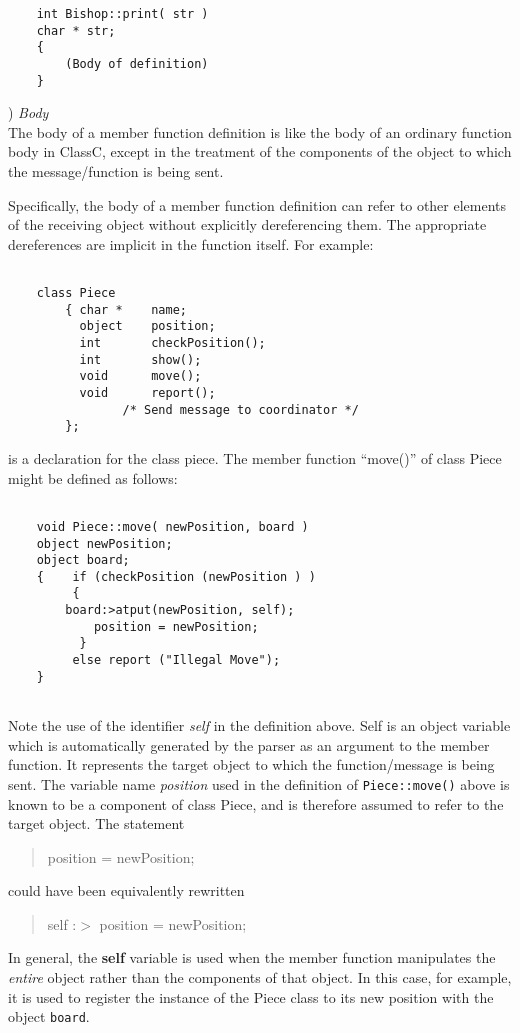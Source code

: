 \begin{verbatim}
	int Bishop::print( str )
	char * str;
	{
		(Body of definition)
	}

\end{verbatim}


{) {\large \em Body}}\\
The body of a member function definition is like the body of an ordinary
function body in ClassC, except in the treatment of the
components of the object to which the message/function is being sent.

Specifically, the body of a member function definition can refer to other
elements of the receiving object without explicitly dereferencing them.
The appropriate dereferences
are implicit in the function itself.  For example:
\begin{verbatim}

	class Piece
		{ char *	name;
		  object	position;
		  int		checkPosition();
		  int		show();
		  void		move();
		  void		report();
				/* Send message to coordinator */
		};

\end{verbatim}
is a declaration for the class piece.  The member function ``move()'' of class
Piece might be defined as follows:

\begin{verbatim}

	void Piece::move( newPosition, board )
	object newPosition;
	object board;
	{    if (checkPosition (newPosition ) )
	     {
		board:>atput(newPosition, self);
	        position = newPosition;
	      }
	     else report ("Illegal Move");
	}


\end{verbatim}

Note the use of the identifier
{\em self}
in the definition above.  Self is an object variable which is automatically
generated by the parser as an argument to the member function.
It represents the target object to which the function/message is being
sent.  The variable name {\em position} used in the definition of
{\tt Piece::move()} above is known to be a component of class Piece, and is
therefore assumed to refer to the target object.   The statement
\begin{quote}
position = newPosition;
\end{quote}
could have been equivalently rewritten
\begin{quote}
self :$>$ position = newPosition;
\end{quote}
In general, the {\bf self} variable is used when the member function manipulates
the
{\em entire}
object rather than the components of that object.
In this case, for example, it is used to register the
instance of the Piece class to its new position with the object {\tt board}.

